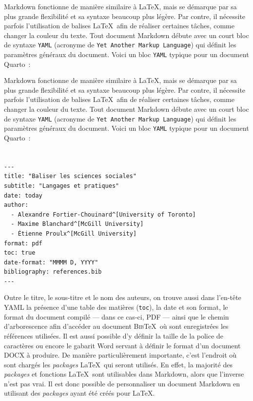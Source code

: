 \documentclass[
  letterpaper,
]{scrbook}
\begin{document}
Markdown fonctionne de manière similaire à \LaTeX, mais se démarque par
sa plus grande flexibilité et sa syntaxe beaucoup plus légère. Par
contre, il nécessite parfois l'utilisation de balises \LaTeX~afin de
réaliser certaines tâches, comme changer la couleur du texte. Tout
document Markdown débute avec un court bloc de syntaxe \texttt{YAML}
(acronyme de \texttt{Yet\ Another\ Markup\ Language}) qui définit les
paramètres généraux du document. Voici un bloc \texttt{YAML} typique
pour un document Quarto~:

Markdown fonctionne de manière similaire à \LaTeX, mais se démarque par
sa plus grande flexibilité et sa syntaxe beaucoup plus légère. Par
contre, il nécessite parfois l'utilisation de balises \LaTeX~afin de
réaliser certaines tâches, comme changer la couleur du texte. Tout
document Markdown débute avec un court bloc de syntaxe \texttt{YAML}
(acronyme de \texttt{Yet\ Another\ Markup\ Language}) qui définit les
paramètres généraux du document. Voici un bloc \texttt{YAML} typique
pour un document Quarto~:


\hypertarget{section}{%
\chapter{}\label{section}}

\begin{verbatim}
---
title: "Baliser les sciences sociales"
subtitle: "Langages et pratiques"
date: today
author:
  - Alexandre Fortier-Chouinard^[University of Toronto]
  - Maxime Blanchard^[McGill University]
  - Étienne Proulx^[McGill University]
format: pdf
toc: true
date-format: "MMMM D, YYYY"
bibliography: references.bib
---
\end{verbatim}

Outre le titre, le sous-titre et le nom des auteurs, on trouve aussi
dans l'en-tête YAML la présence d'une table des matières (\texttt{toc}),
la date et son format, le format du document compilé --- dans ce cas-ci,
PDF --- ainsi que le chemin d'arborescence afin d'accéder au document
\textsc{Bib}\TeX~où sont enregistrées les références utilisées. Il est
aussi possible d'y définir la taille de la police de caractères ou
encore le gabarit Word servant à définir le format d'un document DOCX à
produire. De manière particulièrement importante, c'est l'endroit où
sont chargés les \emph{packages} \LaTeX~qui seront utilisés. En effet,
la majorité des \emph{packages} et fonctions \LaTeX~sont utilisables
dans Markdown, alors que l'inverse n'est pas vrai. Il est donc possible
de personnaliser un document Markdown en utilisant des \emph{packages}
ayant été créés pour \LaTeX.
\end{document}
